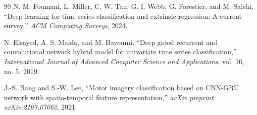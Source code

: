 \documentclass[conference]{IEEEtran}
\begin{document}
\begin{thebibliography}{99}
N. M. Foumani, L. Miller, C. W. Tan, G. I. Webb, G. Forestier, and M. Salehi,
``Deep learning for time series classification and extrinsic regression:
A current survey,''
\emph{ACM Computing Surveys}, 2024.

N. Elsayed, A. S. Maida, and M. Bayoumi,
``Deep gated recurrent and convolutional network hybrid model for univariate
time series classification,''
\emph{International Journal of Advanced Computer Science and Applications},
vol. 10, no. 5, 2019.

J.-S. Bang and S.-W. Lee,
``Motor imagery classification based on CNN-GRU network with spatio-temporal
feature representation,''
\emph{arXiv preprint arXiv:2107.07062}, 2021.

\end{thebibliography}
\end{document}
